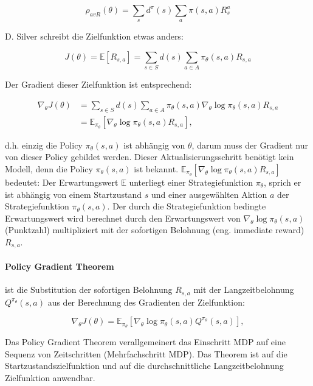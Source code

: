 \documentclass[conference]{IEEEtran}
\begin{document}
\begin{equation*}
\rho_{avR}(\theta) = \sum_s d^\pi(s) \sum_a \pi(s,a) R^a_s
\end{equation*}

D. Silver schreibt die Zielfunktion etwas anders:

\begin{equation*}
J(\theta) = \mathbb{E}[R_{s,a}] = \sum_{s \in S} d(s) \sum_{a \in A} \pi_\theta(s,a) R_{s,a}
\end{equation*}

Der Gradient dieser Zielfunktion ist entsprechend:

\begin{equation*}
\begin{aligned}
\nabla_\theta J(\theta) & = \sum_{s \in S} d(s) \sum_{a \in A} \pi_\theta(s,a) \nabla_\theta \log \pi_\theta(s,a) R_{s,a} \\
& = \mathbb{E}_{\pi_\theta}[\nabla_\theta \log \pi_\theta(s,a) R_{s,a}],
\end{aligned}
\end{equation*}

d.h. einzig die Policy $\pi_\theta(s,a)$ ist abhängig von $\theta$, darum muss der Gradient nur von dieser Policy gebildet werden. Dieser Aktualisierungsschritt benötigt kein Modell, denn die Policy $\pi_\theta(s,a)$ ist bekannt. $\mathbb{E}_{\pi_\theta}[\nabla_\theta \log \pi_\theta(s,a) R_{s,a}]$ bedeutet: Der Erwartungswert $\mathbb{E}$ unterliegt einer Strategiefunktion $\pi_\theta$, sprich er ist abhängig von einem Startzustand $s$ und einer ausgewählten Aktion $a$ der Strategiefunktion $\pi_\theta(s,a)$. Der durch die Strategiefunktion bedingte Erwartungswert wird berechnet durch den Erwartungswert von $\nabla_\theta \log \pi_\theta(s,a)$ (Punktzahl) multipliziert mit der sofortigen Belohnung (eng. immediate reward) $R_{s,a}$. 

\paragraph*{Policy Gradient Theorem} ist die Substitution der sofortigen Belohnung $R_{s,a}$ mit der Langzeitbelohnung $Q^{\pi_\theta}(s,a)$ aus der Berechnung des Gradienten der Zielfunktion:

\begin{equation*}
\nabla_\theta J(\theta) = \mathbb{E}_{\pi_\theta}[\nabla_\theta \log \pi_\theta(s,a) Q^{\pi_\theta}(s,a)],
\end{equation*}

Das Policy Gradient Theorem verallgemeinert das Einschritt MDP auf eine Sequenz von Zeitschritten (Mehrfachschritt MDP). Das Theorem ist auf die Startzustandszielfunktion und auf die durchschnittliche Langzeitbelohnung Zielfunktion anwendbar. 
\end{document}
